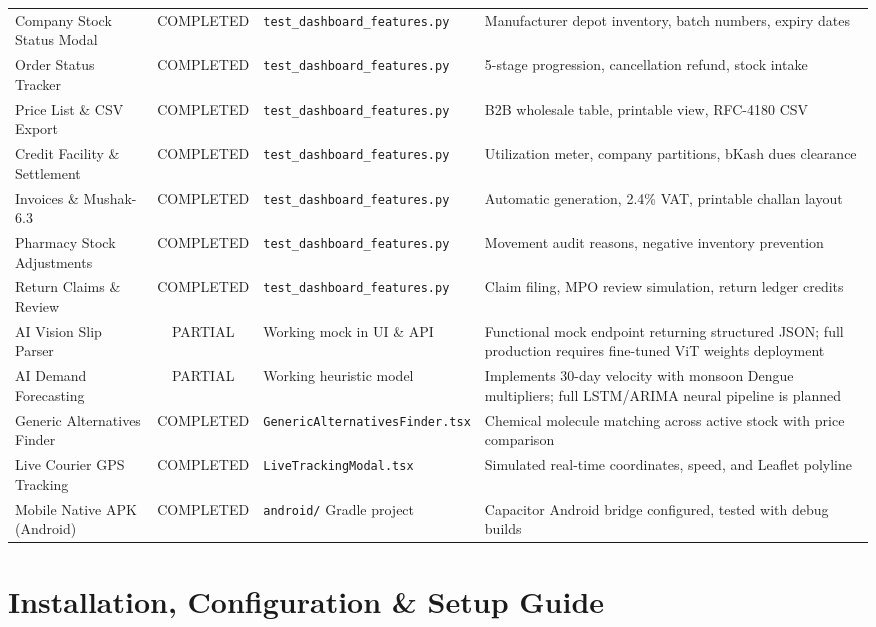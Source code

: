 \documentclass[10pt,a4paper]{article}
\begin{document}
\begin{tabularx}{\textwidth}{p{3.6cm}cp{3.2cm}X}
Company Stock Status Modal & COMPLETED & \texttt{test\_dashboard\_features.py} & Manufacturer depot inventory, batch numbers, expiry dates \\
Order Status Tracker & COMPLETED & \texttt{test\_dashboard\_features.py} & 5-stage progression, cancellation refund, stock intake \\
Price List \& CSV Export & COMPLETED & \texttt{test\_dashboard\_features.py} & B2B wholesale table, printable view, RFC-4180 CSV \\
Credit Facility \& Settlement & COMPLETED & \texttt{test\_dashboard\_features.py} & Utilization meter, company partitions, bKash dues clearance \\
Invoices \& Mushak-6.3 & COMPLETED & \texttt{test\_dashboard\_features.py} & Automatic generation, 2.4\% VAT, printable challan layout \\
Pharmacy Stock Adjustments & COMPLETED & \texttt{test\_dashboard\_features.py} & Movement audit reasons, negative inventory prevention \\
Return Claims \& Review & COMPLETED & \texttt{test\_dashboard\_features.py} & Claim filing, MPO review simulation, return ledger credits \\
AI Vision Slip Parser & PARTIAL & Working mock in UI \& API & Functional mock endpoint returning structured JSON; full production requires fine-tuned ViT weights deployment \\
AI Demand Forecasting & PARTIAL & Working heuristic model & Implements 30-day velocity with monsoon Dengue multipliers; full LSTM/ARIMA neural pipeline is planned \\
Generic Alternatives Finder & COMPLETED & \texttt{GenericAlternativesFinder.tsx} & Chemical molecule matching across active stock with price comparison \\
Live Courier GPS Tracking & COMPLETED & \texttt{LiveTrackingModal.tsx} & Simulated real-time coordinates, speed, and Leaflet polyline \\
Mobile Native APK (Android) & COMPLETED & \texttt{android/} Gradle project & Capacitor Android bridge configured, tested with debug builds \\
\end{tabularx}

\section{Installation, Configuration \& Setup Guide}
\end{document}
